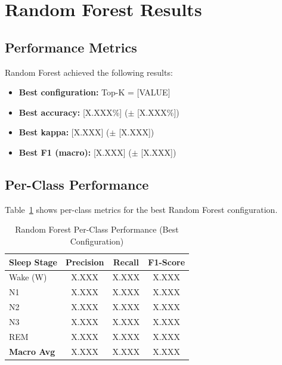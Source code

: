 
\section{Random Forest Results}
\label{sec:rf_results}

\subsection{Performance Metrics}
\label{subsec:rf_metrics}


Random Forest achieved the following results:

\begin{itemize}
    \item \textbf{Best configuration:} Top-K = [VALUE]
    \item \textbf{Best accuracy:} [X.XXX\%] ($\pm$ [X.XXX\%])
    \item \textbf{Best kappa:} [X.XXX] ($\pm$ [X.XXX])
    \item \textbf{Best F1 (macro):} [X.XXX] ($\pm$ [X.XXX])
\end{itemize}

\subsection{Per-Class Performance}
\label{subsec:rf_perclass}

Table~\ref{tab:rf_perclass} shows per-class metrics for the best Random Forest configuration.

\begin{table}[htbp]
    \centering
    \caption{Random Forest Per-Class Performance (Best Configuration)}
    \label{tab:rf_perclass}
    \begin{tabular}{lccc}
        \toprule
        \textbf{Sleep Stage} & \textbf{Precision} & \textbf{Recall} & \textbf{F1-Score} \\
        \midrule
        Wake (W) & X.XXX & X.XXX & X.XXX \\
        N1 & X.XXX & X.XXX & X.XXX \\
        N2 & X.XXX & X.XXX & X.XXX \\
        N3 & X.XXX & X.XXX & X.XXX \\
        REM & X.XXX & X.XXX & X.XXX \\
        \midrule
        \textbf{Macro Avg} & X.XXX & X.XXX & X.XXX \\
        \bottomrule
    \end{tabular}
\end{table}

